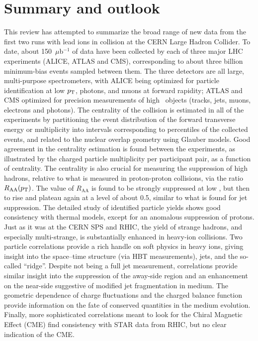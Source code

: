 \section{Summary and outlook}
\label{secall:summary}
This review has attempted to summarize the broad range of new data from the first two
runs with lead ions in collision at the CERN Large Hadron Collider.
To date, about 150~$\mu$b$^{-1}$ of data have been collected by each of
three major LHC experiments (ALICE, ATLAS and CMS), corresponding to about three billion
minimum-bias events sampled between them.
The three detectors are all large, multi-purpose spectrometers, with ALICE being optimized
for particle identification at low $p_{\rm T}$, photons, and muons at forward rapidity;
ATLAS and CMS optimized for precision measurements
of high \pT\ objects (tracks, jets, muons, electrons and photons).
The centrality of the collision is estimated in all of the experiments by partitioning
the event distribution of the forward transverse energy or multiplicity into
intervals corresponding to percentiles of the collected events, and related to
the nuclear overlap geometry using Glauber models.
Good agreement in the centrality estimation is found between the experiments, as illustrated
by the charged particle multiplicity per participant pair, as a function of centrality.
The centrality is also crucial for measuring the suppression of high \pT hadrons, relative
to what is measured in proton-proton collisions, via the ratio $R_{\mathrm{AA}}( \mbox{$p_{\mathrm{T}}$} )$.
The value of $R_{\mathrm{AA}}$ is found to be strongly suppressed at low \pT, but then to rise
and plateau again at a level of about 0.5, similar to what is found for jet suppression.
The detailed study of identified particle yields shows good consistency with thermal models,
except for an anomalous suppression of protons.
Just as it was at the CERN SPS and RHIC, the yield of strange hadrons, and especially multi-strange, is substantially
enhanced in heavy-ion collisions.
Two particle correlations provide a rich handle on soft physics in heavy ions, giving
insight into the space--time structure (via HBT measurements), jets, and the so-called
``ridge''.  Despite not being a full jet measurement, correlations provide similar insight
into the suppression of the away-side region and an enhancement on the near-side
suggestive of modified jet fragmentation in medium.
The geometric dependence of charge fluctuations and the charged balance function provide
information on the fate of conserved quantities in the medium evolution.
Finally, more sophisticated correlations meant to look for the Chiral Magnetic Effect (CME)
find consistency with STAR data from RHIC, but no clear indication of the CME.


